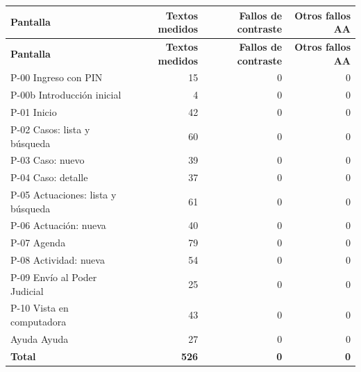 \small
\begin{longtable}{@{}p{6.8cm}rrr@{}}
\toprule
\textbf{Pantalla} & \textbf{Textos medidos} & \textbf{Fallos de contraste} & \textbf{Otros fallos AA} \\
\midrule
\endfirsthead
\toprule
\textbf{Pantalla} & \textbf{Textos medidos} & \textbf{Fallos de contraste} & \textbf{Otros fallos AA} \\
\midrule
\endhead
\bottomrule
\endfoot
P-00 Ingreso con PIN & 15 & 0 & 0 \\
P-00b Introducción inicial & 4 & 0 & 0 \\
P-01 Inicio & 42 & 0 & 0 \\
P-02 Casos: lista y búsqueda & 60 & 0 & 0 \\
P-03 Caso: nuevo & 39 & 0 & 0 \\
P-04 Caso: detalle & 37 & 0 & 0 \\
P-05 Actuaciones: lista y búsqueda & 61 & 0 & 0 \\
P-06 Actuación: nueva & 40 & 0 & 0 \\
P-07 Agenda & 79 & 0 & 0 \\
P-08 Actividad: nueva & 54 & 0 & 0 \\
P-09 Envío al Poder Judicial & 25 & 0 & 0 \\
P-10 Vista en computadora & 43 & 0 & 0 \\
Ayuda Ayuda & 27 & 0 & 0 \\
\midrule
\textbf{Total} & \textbf{526} & \textbf{0} & \textbf{0} \\
\end{longtable}